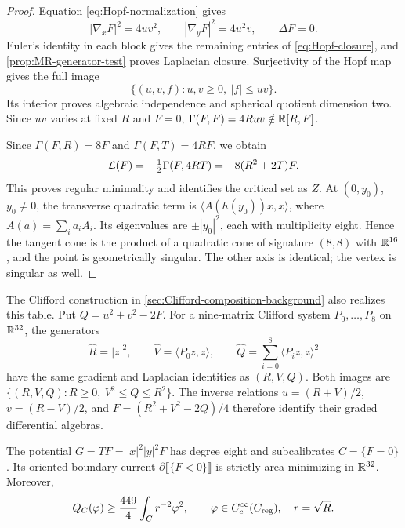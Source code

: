 \begin{proof}
Equation \eqref{eq:Hopf-normalization} gives
\[
 |\nabla_xF|^2=4uv^2,\qquad
 |\nabla_yF|^2=4u^2v,\qquad \Delta F=0.
\]
Euler's identity in each block gives the remaining entries of
\eqref{eq:Hopf-closure}, and \cref{prop:MR-generator-test}
proves Laplacian closure. Surjectivity of the Hopf map gives
the full image
\[
 \{(u,v,f):u,v\geq0,\ |f|\leq uv\}.
\]
Its interior proves algebraic independence and spherical quotient
dimension two. Since $uv$ varies at fixed $R$ and $F=0$,
$\Gamma(F,F)=4Ruv\notin\mathbb R[R,F]$.

Since \(\Gamma(F,R)=8F\) and \(\Gamma(F,T)=4RF\), we obtain
\[
 \mathcal L(F)=-\tfrac12\Gamma(F,4RT)=-8(R^2+2T)F.
\]
This proves regular minimality and identifies the critical set as
\(Z\). At \((0,y_0)\), \(y_0\ne0\), the transverse quadratic term
is \(\langle A(h(y_0))x,x\rangle\), where
\(A(a)=\sum_i a_iA_i\). Its eigenvalues are
\(\pm|y_0|^2\), each with multiplicity eight. Hence the tangent
cone is the product of a quadratic cone of signature \((8,8)\)
with \(\mathbb R^{16}\), and the point is geometrically singular.
The other axis is identical; the vertex is singular as well.
\end{proof}

\begin{remark}
The Clifford construction in \cref{sec:Clifford-composition-background}
also realizes this table. Put
\(Q=u^2+v^2-2F\). For a nine-matrix Clifford system
\(P_0,\ldots,P_8\) on \(\mathbb R^{32}\), the generators
\[
 \widehat R=|z|^2,\qquad
 \widehat V=\langle P_0z,z\rangle,\qquad
 \widehat Q=\sum_{i=0}^8\langle P_iz,z\rangle^2
\]
have the same gradient and Laplacian identities as \((R,V,Q)\).
Both images are
\(\{(R,V,Q):R\geq0,\ V^2\leq Q\leq R^2\}\).
The inverse relations
\(u=(R+V)/2\), \(v=(R-V)/2\), and \(F=(R^2+V^2-2Q)/4\)
therefore identify their graded differential algebras.
\end{remark}

\begin{theorem}
\label{thm:Hopf-pairing}
The potential \(G=TF=|x|^2|y|^2F\) has degree eight and
subcalibrates \(C=\{F=0\}\). Its oriented boundary current
\(\partial\llbracket\{F<0\}\rrbracket\) is strictly area minimizing
in \(\mathbb R^{32}\). Moreover,
\begin{equation}\label{eq:Hopf-Hardy-bound}
 Q_C(\varphi)\geq\frac{449}{4}\int_C r^{-2}\varphi^2,
 \qquad \varphi\in C_c^\infty(C_{\mathrm{reg}}),\quad r=\sqrt R.
\end{equation}
\end{theorem}

